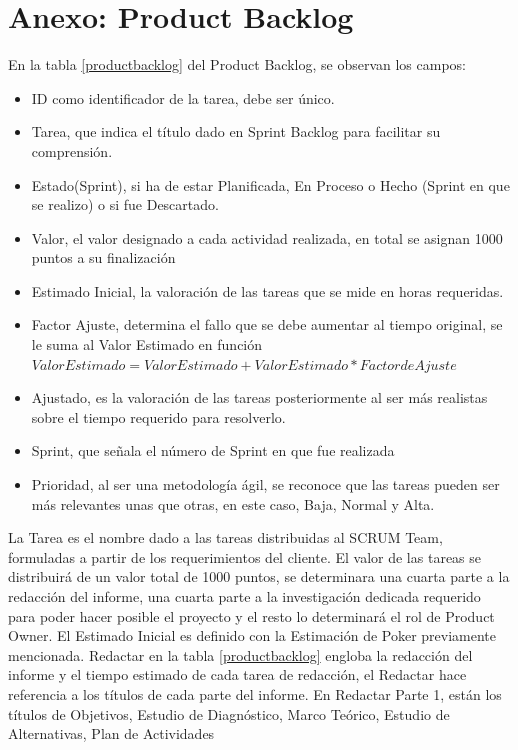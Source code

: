 \section{Anexo: Product Backlog} 
En la tabla \ref{productbacklog} del Product Backlog, se observan los campos:
\begin{itemize}
	\item ID como identificador de la tarea, debe ser único.
	\item Tarea, que indica el título dado en Sprint Backlog para facilitar su comprensión.
	\item Estado(Sprint), si ha de estar Planificada, En Proceso o Hecho (Sprint en que se realizo) o si fue Descartado.
	\item Valor, el valor designado a cada actividad realizada, en total se asignan 1000 puntos a su finalización
	\item Estimado Inicial, la valoración de las tareas que se mide en horas requeridas.
	\item Factor Ajuste, determina el fallo que se debe aumentar al tiempo original, se le suma al Valor Estimado en función $Valor Estimado = Valor Estimado + Valor Estimado * Factor de Ajuste$
	\item Ajustado, es la valoración de las tareas posteriormente al ser más realistas sobre el tiempo requerido para resolverlo.
	\item Sprint, que señala el número de Sprint en que fue realizada
	\item Prioridad, al ser una metodología ágil, se reconoce que las tareas pueden ser más relevantes unas que otras, en este caso, Baja, Normal y Alta.
	
\end{itemize}
La Tarea es el nombre dado a las tareas distribuidas al SCRUM Team, formuladas a partir de los requerimientos del cliente.
El valor de las tareas se distribuirá de un valor total de 1000 puntos, se determinara una cuarta parte a la redacción del informe, una cuarta parte a la investigación dedicada requerido para poder hacer posible el proyecto y el resto lo determinará el rol de Product Owner.
El Estimado Inicial es definido con la Estimación de Poker previamente mencionada.
Redactar en la tabla \ref{productbacklog} engloba la redacción del informe y el tiempo estimado de cada tarea de redacción, el Redactar hace referencia a los títulos de cada parte del informe.
En Redactar Parte 1, están los títulos de Objetivos, Estudio de Diagnóstico, Marco Teórico, Estudio de Alternativas, Plan de Actividades
